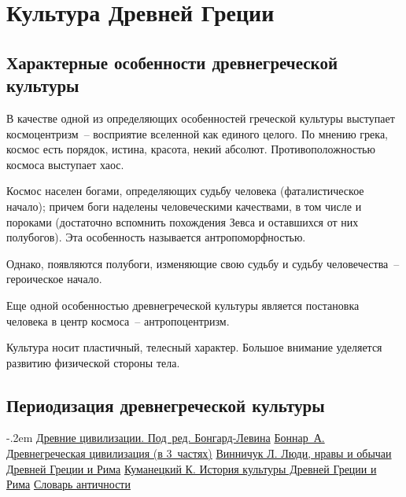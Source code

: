 \chapter{Культура Древней Греции}
\section{Характерные особенности древнегреческой культуры}

  В качестве одной из определяющих особенностей греческой культуры выступает
  космоцентризм~-- восприятие вселенной как единого целого. По мнению грека,
  космос есть порядок, истина, красота, некий абсолют. Противоположностью
  космоса выступает хаос.
  
  Космос населен богами, определяющих судьбу человека (фаталистическое начало);
  причем боги наделены человеческими качествами, в том числе и пороками
  (достаточно вспомнить похождения Зевса и оставшихся от них полубогов). Эта
  особенность называется антропоморфностью.
  
  Однако, появляются полубоги, изменяющие свою судьбу и судьбу человечества~--
  героическое начало.
  
  Еще одной особенностью древнегреческой культуры является постановка человека в
  центр космоса~-- антропоцентризм.
  
  \charskip{*}
  
  Культура носит пластичный, телесный характер. Большое внимание уделяется
  развитию физической стороны тела.

\section{Периодизация древнегреческой культуры}

  \begin{thebibliography}{9}
    \itemsep -.2em
     \href{http://padabum.com/x.php?id=9471}{Древние цивилизации.
      Под~ред. Бонгард-Левина}
     \href{http://dwl.alleng.ru/d_ar/hist_vm/hist009_1.zip}{Боннар~А.
      Древнегреческая цивилизация (в 3~частях)}
     \href{http://rghost.ru/download/48161358/%
      1c27882309bef2be09ca96fbc9283bea85743dcd/hist_vm040.zip}{Винничук Л. Люди,
      нравы и обычаи Древней Греции и Рима}
     \href{http://vk.cc/2j6Z3y}{Куманецкий К. История культуры
      Древней Греции и Рима}
     \href{http://rghost.ru/download/48076731/%
      a45295d3ba73f1541079ebf3b1f35a3f9b3e8574/cult013.zip}{Словарь античности}
  \end{thebibliography}
